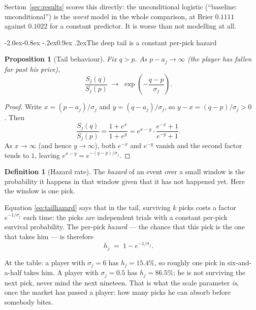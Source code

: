 \documentclass[10pt,a4paper]{article}
\makeatletter
\theoremstyle{plain}
\newtheorem{proposition}[theorem]{Proposition}
\theoremstyle{definition}
\newtheorem{definition}[theorem]{Definition}
\theoremstyle{remark}
\renewcommand\subsection{\@startsection{subsection}{2}{\z@}%
  {-2.0ex\@plus -0.8ex \@minus -.2ex}{0.9ex \@plus .2ex}{\normalfont\large\bfseries}}
\makeatother
\begin{document}
Section~\ref{sec:results} scores this directly: the unconditional logistic
(``baseline: unconditional'') is the \emph{worst} model in the whole comparison, at
Brier $0.1111$ against $0.1022$ for a constant predictor. It is worse than not
modelling at all.

\subsection{The deep tail is a constant per-pick hazard}
\label{sec:hazard}

\begin{proposition}[Tail behaviour]
\label{prop:tail}
Fix $q > p$. As $p - a_j \to \infty$ (the player has fallen far past his price),
\begin{equation}
\frac{S_j(q)}{S_j(p)} \;\longrightarrow\; \exp\!\left(-\frac{q-p}{\sigma_j}\right).
\label{eq:tailhazard}
\end{equation}
\end{proposition}

\begin{proof}
Write $x = (p-a_j)/\sigma_j$ and $y = (q-a_j)/\sigma_j$, so $y - x = (q-p)/\sigma_j > 0$.
Then
\[
\frac{S_j(q)}{S_j(p)} = \frac{1+e^{x}}{1+e^{y}}
 = e^{x-y}\cdot\frac{e^{-x}+1}{e^{-y}+1}.
\]
As $x \to \infty$ (and hence $y \to \infty$), both $e^{-x}$ and $e^{-y}$ vanish and the
second factor tends to $1$, leaving $e^{x-y} = e^{-(q-p)/\sigma_j}$.
\end{proof}

\begin{definition}[Hazard rate]
The \emph{hazard} of an event over a small window is the probability it happens in that
window given that it has not happened yet. Here the window is one pick.
\end{definition}

Equation \eqref{eq:tailhazard} says that in the tail, surviving $k$ picks costs a factor
$e^{-1/\sigma_j}$ each time: the picks are independent trials with a constant per-pick
survival probability. The per-pick \emph{hazard} --- the chance that this pick is the
one that takes him --- is therefore
\begin{equation}
h_j \;=\; 1 - e^{-1/\sigma_j}.
\label{eq:perpick}
\end{equation}

At the table: a player with $\sigma_j = 6$ has $h_j = 15.4\%$, so roughly one pick in
six-and-a-half takes him. A player with $\sigma_j = 0.5$ has $h_j = 86.5\%$; he is not
surviving the next pick, never mind the next nineteen. That is what the scale parameter
\emph{is}, once the market has passed a player: how many picks he can absorb before
somebody bites.
\end{document}
